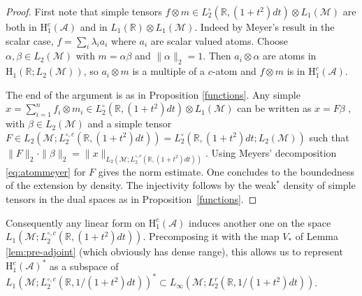 \documentclass[psamsfonts]{amsart}
\newcommand{\Lone}{L_1}
\newcommand{\Linfty}{L_\infty}
\newcommand{\Ltwo}{L_2}
\newcommand{\Ltwozero}{L_2^\circ}
\newcommand{\Ltwor}{L_2^r}
\newcommand{\Ltwoczero}{L^{\circ,c}_2}
\newcommand{\Hone}{\mathrm{H}_1}
\newcommand{\Honec}{\mathrm{H}_1^c}
\newcommand{\Hardyc}{\Honec(\mathcal{A})}
\begin{document}
    \begin{proof}
      First note that simple tensors
      $f\otimes m \in \Ltwozero(\mathbb{R},(1+t^2)dt)\otimes
      \Lone(\mathcal M)$ are both in
      $\Hardyc$ and in $\Lone(\mathbb{R})\otimes\Lone(\mathcal M)$. Indeed by
      Meyer's result in the scalar case, $f=\sum_i \lambda_i a_i$ where
      $a_i$ are scalar valued atoms. Choose
      $\alpha,\beta\in \Ltwo(\mathcal M)$ with $m=\alpha\beta$ and
      $\|\alpha\|_2=1$. Then $a_i\otimes\alpha$ are atoms in
      $\Hone(\mathbb{R};\Ltwo(\mathcal{M}))$, so $a_i\otimes m$ is a
      multiple of a $c$-atom and $f \otimes m$ is in $\Hardyc$.

      The end of the argument is as in Proposition \ref{functions}. Any
      simple
      $x=\sum_{i=1}^n f_i\otimes m_i\in
      \Ltwozero(\mathbb{R},(1+t^2)dt)\otimes \Lone(\mathcal M)$ can be
      written as $x=F \beta$ , with $\beta\in \Ltwo(\mathcal M)$ and a
      simple tensor
      $F\in \Ltwo(\mathcal M;\Ltwoczero(\mathbb{R},(1+t^2)dt))=
      \Ltwozero(\mathbb{R},(1+t^{2})dt;\Ltwo(\mathcal{M}))$ such that
      $ \|F\|_2 \cdot \|\beta\|_2=\|x\|_{\Ltwo(\mathcal
        M;\Ltwoczero(\mathbb{R},(1+t^2)dt))}$. Using Meyers'
      decomposition \eqref{eq:atommeyer} for $F$ gives the norm estimate. One
      concludes to the boundedness of the extension by density. The injectivity follows by the weak$^*$ density of simple tensors in the dual spaces as in Proposition~\ref{functions}. 
    \end{proof}

    Consequently any linear form on $\Hardyc$ induces another one on the space $\Lone(\mathcal M;\Ltwoczero(\mathbb{R},(1+t^2)dt))$. Precomposing it with the map $V_*$ of Lemma \ref{lem:pre-adjoint} (which obviously
    has dense range), this allows us to represent $\Hardyc^*$ as a subspace of 
    $\Lone(\mathcal M;\Ltwoczero(\mathbb{R},1/(1+t^2)dt))^*\subset
    \Linfty(\mathcal M;\Ltwor(\mathbb{R},1/(1+t^2)dt))$.
\end{document}
